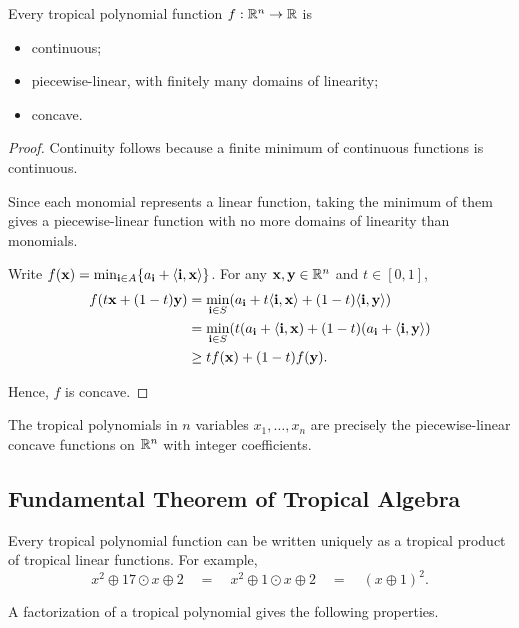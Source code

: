 \documentclass[../../main.tex]{subfiles}
\begin{document}
\begin{lem}
    Every tropical polynomial function $f:\mathbb{R}^n \to \mathbb{R}$ is
    \begin{itemize}
        \item continuous;
        \item piecewise-linear, with finitely many domains of linearity;
        \item concave.
    \end{itemize}
\end{lem}

\begin{proof}
    Continuity follows because a finite minimum of continuous functions is continuous.

    Since each monomial represents a linear function, taking the minimum of them gives a piecewise-linear function with no more domains of linearity than monomials.

    Write $f(\mathbf{x})=\min_{\mathbf{i} \in A}\{a_{\mathbf{i}} + \langle \mathbf{i},\mathbf{x}\rangle\}$. For any $\mathbf{x},\mathbf{y} \in \mathbb{R}^n$ and $t \in [0,1]$,
    \begin{align*}
        f(t\mathbf{x}+(1-t)\mathbf{y})
        &=\min_{\mathbf{i} \in S}(a_{\mathbf{i}}+t\langle \mathbf{i},\mathbf{x}\rangle+(1-t)\langle \mathbf{i},\mathbf{y}\rangle)\\
        &=\min_{\mathbf{i} \in S}(t(a_{\mathbf{i}}+\langle \mathbf{i},\mathbf{x}) +(1-t)(a_{\mathbf{i}}+\langle \mathbf{i},\mathbf{y}\rangle)\\
        &\ge tf(\mathbf{x})+(1-t)f(\mathbf{y}).
    \end{align*}

    Hence, $f$ is concave.
\end{proof}

\begin{lem} \label{lem:polynomial-pl graphs}
    The tropical polynomials in $n$ variables $x_1,\dots,x_n$ are precisely the piecewise-linear concave functions on $\mathbb{R}^n$ with integer coefficients.
\end{lem}

\subsection{Fundamental Theorem of Tropical Algebra}

Every tropical polynomial function can be written uniquely as a tropical product of tropical linear functions. For example, 
\[x^2\oplus 17\odot x\oplus 2 \quad = \quad x^2\oplus 1\odot x\oplus 2 \quad =\quad (x\oplus 1)^2.\]

A factorization of a tropical polynomial gives the following properties.
\end{document}
